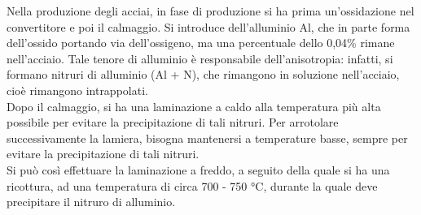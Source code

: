 Nella produzione degli acciai, in fase di produzione si ha prima un’ossidazione nel convertitore e poi il calmaggio. Si introduce dell’alluminio Al, che in parte forma dell’ossido portando via dell’ossigeno, ma una percentuale dello 0,04\% rimane nell’acciaio. Tale tenore di alluminio è responsabile dell’anisotropia: infatti, si formano nitruri di alluminio (Al + N), che rimangono in soluzione nell’acciaio, cioè rimangono intrappolati.\\
Dopo il calmaggio, si ha una laminazione a caldo alla temperatura più alta possibile per evitare la precipitazione di tali nitruri. Per arrotolare successivamente la lamiera, bisogna mantenersi a temperature basse, sempre per evitare la precipitazione di tali nitruri.\\
Si può così effettuare la laminazione a freddo, a seguito della quale si ha una ricottura, ad una temperatura di circa 700 - 750 °C, durante la quale deve precipitare il nitruro di alluminio.